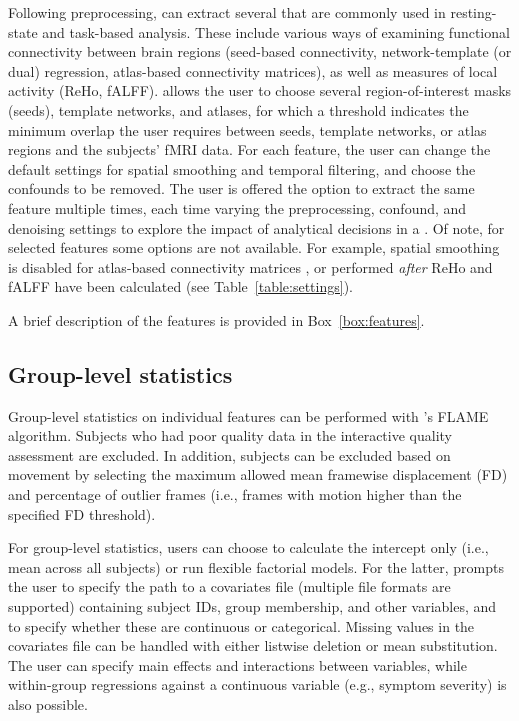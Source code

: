 Following preprocessing,  can extract several  that are commonly used in resting-state and task-based analysis. These include various ways of examining functional connectivity between brain regions (seed-based connectivity, network-template (or dual) regression, atlas-based connectivity matrices), as well as measures of local activity (ReHo, fALFF).  allows the user to choose several region-of-interest masks (seeds), template networks, and atlases, for which a threshold indicates the minimum overlap the user requires between seeds, template networks, or atlas regions and the subjects' fMRI data. For each feature, the user can change the default settings for spatial smoothing and temporal filtering, and choose the confounds to be removed. The user is offered the option to extract the same feature multiple times, each time varying the preprocessing, confound, and denoising settings to explore the impact of analytical decisions in a . Of note, for selected features some options are not available. For example, spatial smoothing is disabled for atlas-based connectivity matrices \parencite{alakorkko2017}, or performed \emph{after} ReHo and fALFF have been calculated (see Table~\ref{table:settings}).

A brief description of the features is provided in Box~\ref{box:features}.

\subsection{Group-level statistics}

Group-level statistics on individual features can be performed with 's FLAME algorithm. Subjects who had poor quality data in the interactive quality assessment are excluded. In addition, subjects can be excluded based on movement by selecting the maximum allowed mean framewise displacement (FD) and percentage of outlier frames (i.e., frames with motion higher than the specified FD threshold).

For group-level statistics, users can choose to calculate the intercept only (i.e., mean across all subjects) or run flexible factorial models. For the latter,  prompts the user to specify the path to a covariates file (multiple file formats are supported) containing subject IDs, group membership, and other variables, and to specify whether these are continuous or categorical. Missing values in the covariates file can be handled with either listwise deletion or mean substitution. The user can specify main effects and interactions between variables, while within-group regressions against a continuous variable (e.g., symptom severity) is also possible.

